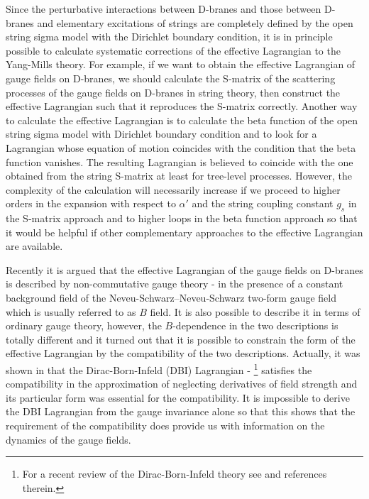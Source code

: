 \documentclass[a4paper,12pt]{article}
\begin{document}
Since the perturbative interactions between D-branes
and those between D-branes
and elementary excitations of strings
are completely defined
by the open string sigma model with the Dirichlet boundary condition,
it is in principle possible to calculate systematic corrections
of the effective Lagrangian
to the Yang-Mills theory.
For example, if we want to obtain the effective Lagrangian
of gauge fields on D-branes, we should calculate the S-matrix
of the scattering processes of the gauge fields
on D-branes in string theory,
then construct the effective Lagrangian such that it
reproduces the S-matrix correctly.
Another way to calculate the effective Lagrangian
is to calculate the beta function of the open string sigma model
with Dirichlet boundary condition
and to look for a Lagrangian whose equation of motion coincides
with the condition that the beta function vanishes.
The resulting Lagrangian is believed to coincide with
the one obtained from the string S-matrix
at least for tree-level processes.
However, the complexity of the calculation will necessarily increase
if we proceed to higher orders in the expansion with respect to
$\alpha'$ and the string coupling constant $g_s$
in the S-matrix approach
and to higher loops in the beta function approach
so that it would be helpful if other complementary approaches
to the effective Lagrangian are available.

Recently it is argued that
the effective Lagrangian of the gauge fields on D-branes
is described by non-commutative gauge theory
\cite{CDS}-\cite{Schomerus}
in the presence of a constant background field
of the Neveu-Schwarz--Neveu-Schwarz
two-form gauge field which is usually referred to as $B$ field.
It is also possible to describe it in terms of ordinary gauge theory,
however, the $B$-dependence in the two descriptions
is totally different
and it turned out that it is possible to constrain
the form of the effective Lagrangian
by the compatibility of the two descriptions.
Actually, it was shown in \cite{SW} that
the Dirac-Born-Infeld (DBI)
Lagrangian \cite{FT}-\cite{ACNY}
\footnote{
For a recent review of the Dirac-Born-Infeld theory
see \cite{Tseytlin} and references therein.}
satisfies the compatibility
in the approximation of neglecting derivatives of field strength
and its particular form was essential for the compatibility.
It is impossible to derive the DBI Lagrangian from
the gauge invariance alone so that
this shows that the requirement of the compatibility
does provide us with information on the dynamics of the gauge fields.
\end{document}
